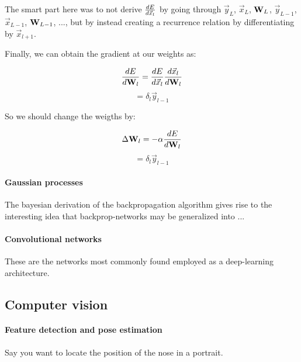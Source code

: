 The smart part here was to not derive $  \frac{ \mathop{dE} }{ \mathop{d\vec{x}_l} }  $ by going through $\vec{y}_L$, $\vec{x}_L$, $\mathbf{W}_L$, $\vec{y}_{L-1}$, $\vec{x}_{L-1}$, $\mathbf{W}_{L-1}$, ..., but by instead creating a recurrence relation by differentiating by $\vec{x}_{l+1}$.

Finally, we can obtain the gradient at our weights as: 

$$  \frac{ \mathop{dE} }{ \mathop{d\mathbf{W}_l} }  =  \frac{ \mathop{dE} }{ \mathop{d\vec{x}_l} }   \frac{ \mathop{d\vec{x}_l} }{ \mathop{d\mathbf{W}_l} }  $$
$$ = \delta_l \vec{y}_{l-1} $$

So we should change the weigths by: 

$$ \Delta \mathbf{W}_l = - \alpha  \frac{ \mathop{dE} }{ \mathop{d\mathbf{W}_l} }  $$
$$ = \delta_l \vec{y}_{l-1} $$


\paragraph{Gaussian processes}

The bayesian derivation of the backpropagation algorithm gives rise to the interesting idea that backprop-networks may be generalized into ...

\paragraph{Convolutional networks}

These are the networks most commonly found employed as a deep-learning architecture. 

\subsection{Computer vision}

\paragraph{Feature detection and pose estimation}

Say you want to locate the position of the nose in a portrait. 